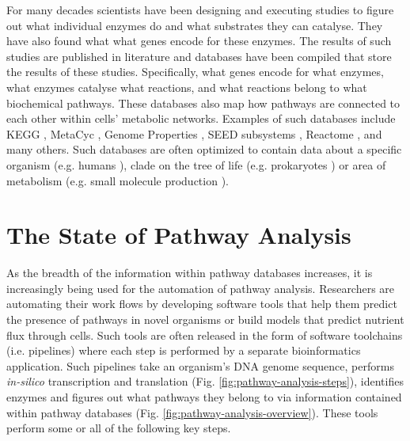 For many decades scientists have been designing and executing studies to figure out what individual enzymes do and what substrates they can catalyse. They have also found what what genes encode for these enzymes. The results of such studies are published in literature and databases have been compiled that store the results of these studies. Specifically, what genes encode for what enzymes, what enzymes catalyse what reactions, and what reactions belong to what biochemical pathways. These databases also map how pathways are connected to each other within cells' metabolic networks. Examples of such databases include KEGG \cite{kanehisa2000kegg}, MetaCyc \cite{karp2002metacyc}, Genome Properties \cite{richardson2018genome}, SEED subsystems \cite{overbeek2005subsystems}, Reactome \cite{croft2013reactome}, and many others. Such databases are often optimized to contain data about a specific organism (e.g. humans \cite{croft2013reactome}), clade on the tree of life (e.g. prokaryotes \cite{richardson2018genome}) or area of metabolism (e.g. small molecule production \cite{Jewison2014}).

\section{The State of Pathway Analysis}

As the breadth of the information within pathway databases increases, it is increasingly being used for the automation of pathway analysis. Researchers are automating their work flows by developing software tools that help them predict the presence of pathways in novel organisms or build models that predict nutrient flux through cells. Such tools are often released in the form of software toolchains (i.e. pipelines) where each step is performed by a separate bioinformatics application. Such pipelines take an organism's DNA genome sequence, performs \textit{in-silico} transcription and translation (Fig. \ref{fig:pathway-analysis-steps}), identifies enzymes and figures out what pathways they belong to via information contained within pathway databases (Fig. \ref{fig:pathway-analysis-overview}). These tools perform some or all of the following key steps.

